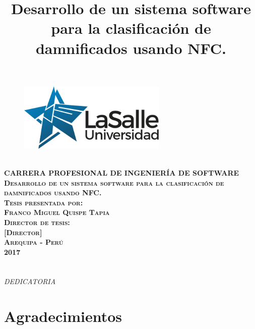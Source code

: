 \documentclass[11pt,openany]{book}
\begin{document}
	\title{Desarrollo de un sistema software para la clasificación de damnificados usando NFC.} 

	\begin{titlepage}
	\begin{center}

	\begin{figure}
		\centering
		\includegraphics[scale=2.5]{salle.PNG}
	\end{figure}\ \\

	\textsc{\textbf{CARRERA PROFESIONAL DE INGENIERÍA DE SOFTWARE}}\\[4em]

	\textsc{\textbf {Desarrollo de un sistema software para la clasificación de damnificados usando NFC.}}\\[4em]

	\textsc{\textbf {Tesis presentada por:}}\\
	\textsc{\textbf {Franco Miguel Quispe Tapia}}\\[3em]

	\textsc{\textbf {Director de tesis:}}\\
	\textsc{\textbf {[Director]}}\\[4em]
	\textsc{\textbf {Arequipa - Perú}}\\
	\textsc{\textbf {2017}}\\[1em]

	\end{center}
	\end{titlepage}

	\pagestyle{empty}
	\frontmatter
	\chapter*{}
	\begin{flushright}
	\textit{DEDICATORIA}
	\end{flushright}

	\chapter*{Agradecimientos}
\end{document}
